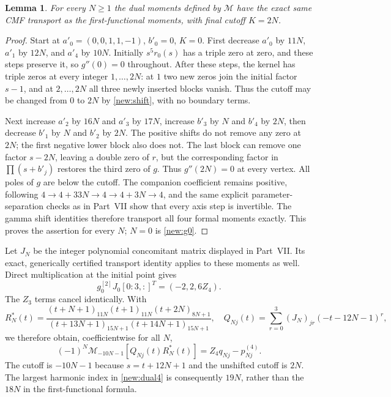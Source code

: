 \documentclass[11pt]{article}
\newtheorem{lemma}{Lemma}
\begin{document}
\begin{lemma}\label{new:transport}
For every $N\ge1$ the dual moments defined by $\mathcal M$ have the exact
same CMF transport as the first-functional moments, with final cutoff $K=2N$.
\end{lemma}
\begin{proof}
Start at $a'_0=(0,0,1,1,-1)$, $b'_0=0$, $K=0$. First decrease $a'_0$ by
$11N$, $a'_1$ by $12N$, and $a'_4$ by $10N$. Initially $s^5r_0(s)$ has a
triple zero at zero, and these steps preserve it, so $g''(0)=0$ throughout.
After these steps, the kernel has triple zeros at every integer
$1,\ldots,2N$: at $1$ two new zeros join the initial factor $s-1$, and at
$2,\ldots,2N$ all three newly inserted blocks vanish. Thus the cutoff may
be changed from $0$ to $2N$ by \eqref{new:shift}, with no boundary terms.

Next increase $a'_2$ by $16N$ and $a'_3$ by $17N$, increase $b'_3$ by $N$
and $b'_4$ by $2N$, then decrease $b'_1$ by $N$ and $b'_2$ by $2N$.
The positive shifts do not remove any zero at $2N$; the first negative lower
block also does not. The last block can remove one factor $s-2N$, leaving
a double zero of $r$, but the corresponding factor in $\prod(s+b'_j)$
restores the third zero of $g$. Thus $g''(2N)=0$ at every vertex.
All poles of $g$ are below the cutoff. The companion coefficient remains
positive, following $4\to4+33N\to4\to4+3N\to4$, and the same explicit
parameter-separation checks as in Part~VII show that every axis step is
invertible. The gamma shift identities therefore transport all four formal
moments exactly. This proves the assertion for every $N$; $N=0$ is
\eqref{new:g0}.
\end{proof}

Let $J_N$ be the integer polynomial concomitant matrix displayed in Part~VII.
Its exact, generically certified transport identity applies to these moments
as well. Direct multiplication at the initial point gives
\[
 g^{[2]}_0J_0[0\!:\!3,:]^T=(-2,2,6Z_4).
\]
The $Z_3$ terms cancel identically. With
\[
 R_N^*(t)=\frac{(t+N+1)_{11N}(t+1)_{11N}(t+2N)_{8N+1}}
 {(t+13N+1)_{15N+1}(t+14N+1)_{15N+1}},\quad
 Q_{Nj}(t)=\sum_{r=0}^3(J_N)_{jr}(-t-12N-1)^r,
\]
we therefore obtain, coefficientwise for all $N$,
\begin{equation}\label{new:dual4}
 (-1)^N\mathcal M_{-10N-1}[Q_{Nj}(t)R_N^*(t)]
      =Z_4q_{Nj}-p^{(4)}_{Nj}.
\end{equation}
The cutoff is $-10N-1$ because $s=t+12N+1$ and the unshifted cutoff is
$2N$. The largest harmonic index in \eqref{new:dual4} is consequently
$19N$, rather than the $18N$ in the first-functional formula.
\end{document}
